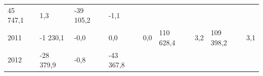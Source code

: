 \begin{longtable}[]{@{}lllllllll@{}}
\begin{minipage}[t]{0.12\columnwidth}
45 747,1\strut
\end{minipage} & \begin{minipage}[t]{0.06\columnwidth}\raggedright
1,3\strut
\end{minipage} & \begin{minipage}[t]{0.09\columnwidth}\raggedright
-39 105,2\strut
\end{minipage} & \begin{minipage}[t]{0.06\columnwidth}\raggedright
-1,1\strut
\end{minipage}\tabularnewline
\begin{minipage}[t]{0.05\columnwidth}\raggedright
2011\strut
\end{minipage} & \begin{minipage}[t]{0.10\columnwidth}\raggedright
-1 230,1\strut
\end{minipage} & \begin{minipage}[t]{0.06\columnwidth}\raggedright
-0,0\strut
\end{minipage} & \begin{minipage}[t]{0.16\columnwidth}\raggedright
0,0\strut
\end{minipage} & \begin{minipage}[t]{0.06\columnwidth}\raggedright
0,0\strut
\end{minipage} & \begin{minipage}[t]{0.12\columnwidth}\raggedright
110 628,4\strut
\end{minipage} & \begin{minipage}[t]{0.06\columnwidth}\raggedright
3,2\strut
\end{minipage} & \begin{minipage}[t]{0.09\columnwidth}\raggedright
109 398,2\strut
\end{minipage} & \begin{minipage}[t]{0.06\columnwidth}\raggedright
3,1\strut
\end{minipage}\tabularnewline
\begin{minipage}[t]{0.05\columnwidth}\raggedright
2012\strut
\end{minipage} & \begin{minipage}[t]{0.10\columnwidth}\raggedright
-28 379,9\strut
\end{minipage} & \begin{minipage}[t]{0.06\columnwidth}\raggedright
-0,8\strut
\end{minipage} & \begin{minipage}[t]{0.16\columnwidth}\raggedright
-43 367,8\strut
\end{minipage} & \begin{minipage}[t]{0.06\columnwidth}\raggedright

\end{minipage}
\end{longtable}
